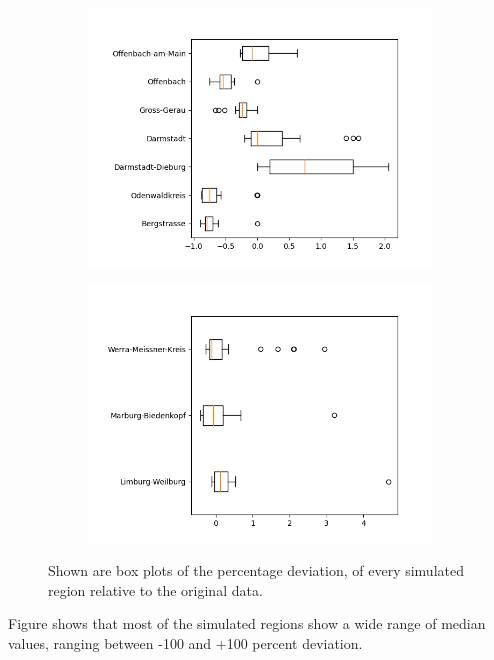 \begin{figure}
\begin{subfigure}[b]{0.4\textwidth}
		\includegraphics[width=\textwidth]{./figures/deviation_box_alt3.png}	
	\end{subfigure}
	\begin{subfigure}[b]{0.4\textwidth}
		\centering
		\includegraphics[width=\textwidth]{./figures/deviation_box_alt4.png}	
	\end{subfigure}
	\caption{Shown are box plots of the percentage deviation, of every simulated region relative to the original data.}
	\label{fig:76_sim_box}
\end{figure}

Figure  shows that most of the simulated regions show a wide range of median values, ranging between
-100 and +100 percent deviation.



